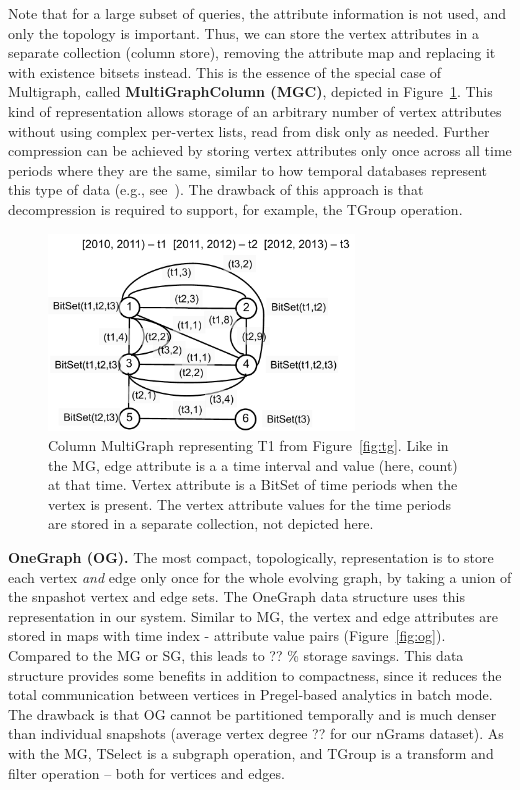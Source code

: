 Note that for a large subset of queries, the attribute information is
not used, and only the topology is important.  Thus, we can store the
vertex attributes in a separate collection (column store), removing
the attribute map and replacing it with existence bitsets instead.
This is the essence of the special case of Multigraph, called {\bf
  MultiGraphColumn (MGC)}, depicted in Figure~\ref{fig:mgc}.  This
kind of representation allows storage of an arbitrary number of vertex
attributes without using complex per-vertex lists, read from disk only
as needed.  Further compression can be achieved by storing vertex
attributes only once across all time periods where they are the same,
similar to how temporal databases represent this type of data (e.g.,
see~\cite{Muller2008}).  The drawback of this approach is that
decompression is required to support, for example, the TGroup
operation.

\begin{figure}[t!]
\includegraphics[width=3.2in]{figs/mgc.pdf}
\caption{Column MultiGraph representing T1 from Figure~\ref{fig:tg}.
  Like in the MG, edge attribute is a a time interval and value (here,
  count) at that time.  Vertex attribute is a BitSet of time periods
  when the vertex is present.  The vertex attribute values for the
  time periods are stored in a separate collection, not depicted
  here.}
\label{fig:mgc}
\end{figure}

{\bf OneGraph (OG).}  The most compact, topologically, representation
is to store each vertex {\em and} edge only once for the whole
evolving graph, by taking a union of the snpashot vertex and edge
sets.  The OneGraph data structure uses this representation in our
system.  Similar to MG, the vertex and edge attributes are stored in
maps with time index - attribute value pairs (Figure~\ref{fig:og}).
Compared to the MG or SG, this leads to ?? \% storage savings.  This
data structure provides some benefits in addition to compactness,
since it reduces the total communication between vertices in
Pregel-based analytics in batch mode.  The drawback is that OG cannot
be partitioned temporally and is much denser than individual snapshots
(average vertex degree ??  for our nGrams dataset).  As with
the MG, TSelect is a subgraph operation, and TGroup is a transform
and filter operation -- both for vertices and edges.

